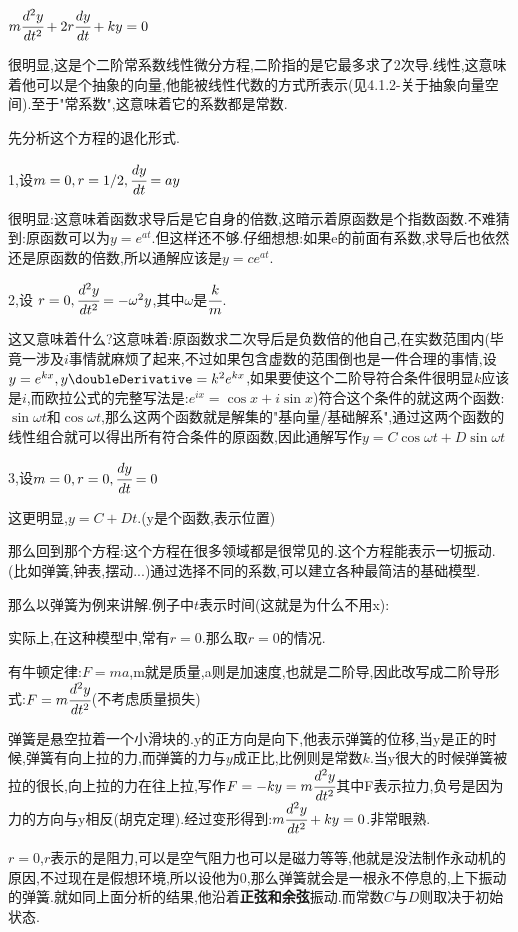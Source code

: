 {{{$m\cfrac{d^2y}{dt^2} + 2r\cfrac{dy}{dt} + ky = 0$

很明显,这是个二阶常系数线性微分方程,二阶指的是它最多求了2次导.线性,这意味着他可以是个抽象的向量,他能被线性代数的方式所表示(见4.1.2-关于抽象向量空间).至于"常系数",这意味着它的系数都是常数.

先分析这个方程的退化形式.

1,设$m = 0, r = 1/2, \cfrac{dy}{dt} = ay$

很明显:这意味着函数求导后是它自身的倍数,这暗示着原函数是个指数函数.不难猜到:原函数可以为$y = e^{at}$.但这样还不够.仔细想想:如果e的前面有系数,求导后也依然还是原函数的倍数,所以通解应该是$y = ce^{at}$.

2,设 $r = 0, \cfrac{d^2y}{dt^2} = -\omega^2y$,其中$\omega$是$\cfrac{k}{m}$.

这又意味着什么?这意味着:原函数求二次导后是负数倍的他自己,在实数范围内(毕竟一涉及$i$事情就麻烦了起来,不过如果包含虚数的范围倒也是一件合理的事情,设$y=e^{kx},y\doubleDerivative = k^{2}e^{kx}$,如果要使这个二阶导符合条件很明显$k$应该是$i$,而欧拉公式的完整写法是:$e^{ix} = \cos x + i\sin x$)符合这个条件的就这两个函数:$\sin\omega t$和$\cos\omega t$,那么这两个函数就是解集的"基向量/基础解系",通过这两个函数的线性组合就可以得出所有符合条件的原函数,因此通解写作$y = C\cos\omega t + D\sin\omega t$

3,设$m = 0, r = 0, \cfrac{dy}{dt} = 0$

这更明显,$y = C + Dt$.(y是个函数,表示位置)

那么回到那个方程:这个方程在很多领域都是很常见的.这个方程能表示一切振动.(比如弹簧,钟表,摆动...)通过选择不同的系数,可以建立各种最简洁的基础模型.

那么以弹簧为例来讲解.例子中$t$表示时间(这就是为什么不用x):

实际上,在这种模型中,常有$r = 0$.那么取$ r = 0$的情况.

有牛顿定律:$F = ma$,m就是质量,a则是加速度,也就是二阶导,因此改写成二阶导形式:$F = m\cfrac{d^2y}{dt^2}$(不考虑质量损失)

弹簧是悬空拉着一个小滑块的.y的正方向是向下,他表示弹簧的位移,当y是正的时候,弹簧有向上拉的力,而弹簧的力与$y$成正比,比例则是常数$k$.当y很大的时候弹簧被拉的很长,向上拉的力在往上拉,写作$F = -ky = m\cfrac{d^2y}{dt^2}$其中F表示拉力,负号是因为力的方向与y相反(胡克定理).经过变形得到:$m\cfrac{d^2y}{dt^2} + ky = 0$.非常眼熟.

$r = 0$,$r$表示的是阻力,可以是空气阻力也可以是磁力等等,他就是没法制作永动机的原因,不过现在是假想环境,所以设他为0,那么弹簧就会是一根永不停息的,上下振动的弹簧.就如同上面分析的结果,他沿着{\bfseries 正弦和余弦}振动.而常数$C$与$D$则取决于初始状态.

}}}
